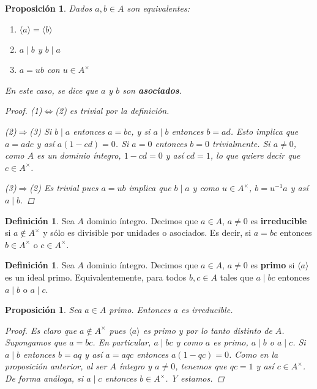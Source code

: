 \documentclass[12pt]{book}
\newtheorem{prop}[teo]{Proposición}
\theoremstyle{definition}
\newtheorem{defn}[teo]{Definición}
\begin{document}
\begin{prop}
Dados $a,b\in A$ son equivalentes: \begin{enumerate}\item $\langle a\rangle = \langle b\rangle$\item $a\mid b$ y $b\mid a$ \item $a=ub$ con $u\in A^\times$ \end{enumerate} En este caso, se dice que $a$ y $b$ son \textbf{asociados}.
\begin{proof}
(1)$\Longleftrightarrow$(2) es trivial por la definición.

(2)$\Longrightarrow$(3) Si $b\mid a$ entonces $a=bc$, y si $a\mid b$ entonces $b=ad$. Esto implica que $a=adc$ y así $a(1-cd)=0$. Si $a=0$ entonces $b=0$ trivialmente. Si $a\neq 0$, como $A$ es un dominio íntegro, $1-cd=0$ y así $cd=1$, lo que quiere decir que $c\in A^\times$.

(3)$\Longrightarrow$(2) Es trivial pues $a=ub$ implica que $b\mid a$ y como $u\in A^\times$, $b=u^{-1}a$ y así $a\mid b$.
\end{proof}
\end{prop}

\begin{defn}
Sea $A$ dominio íntegro. Decimos que $a\in A$, $a\neq 0$ es \textbf{irreducible} si $a\notin A^\times$ y sólo es divisible por unidades o asociados. Es decir, si $a=bc$ entonces $b\in A^\times$ o $c\in A^\times$.
\end{defn}

\begin{defn}
Sea $A$ dominio íntegro. Decimos que $a\in A$, $a\neq 0$ es \textbf{primo} si $\langle a\rangle$ es un ideal primo. Equivalentemente, para todos $b,c\in A$ tales que $a\mid bc$ entonces $a\mid b$ o $a\mid c$.
\end{defn}

\begin{prop}
Sea $a\in A$ primo. Entonces $a$ es irreducible.
\begin{proof}
Es claro que $a\notin A^\times $ pues $\langle a\rangle$ es primo y por lo tanto distinto de $A$. Supongamos que $a=bc$. En particular, $a\mid bc$ y como $a$ es primo, $a\mid b$ o $a\mid c$. Si $a\mid b$ entonces $b=aq$ y así $a=aqc$ entonces $a(1-qc)=0$. Como en la proposición anterior, al ser $A$ íntegro y $a\neq 0$, tenemos que $qc=1$ y así $c\in A^\times$. De forma análoga, si $a\mid c$ entonces $b\in A^\times$. Y estamos.
\end{proof}
\end{prop}
\end{document}
